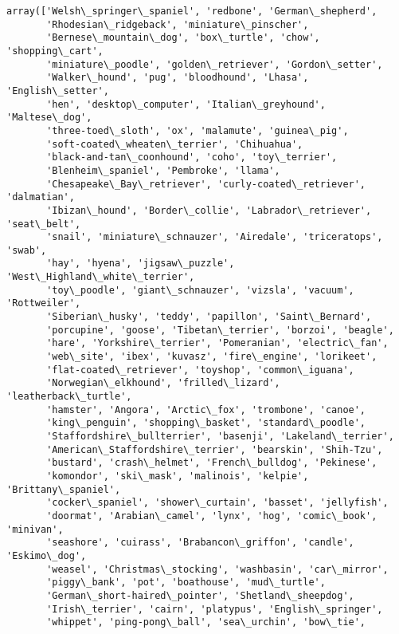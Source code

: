 \documentclass[11pt]{article}
\makeatletter
\newcommand{\boxspacing}{\kern\kvtcb@left@rule\kern\kvtcb@boxsep}
\newcommand{\prompt}[4]{
        {\ttfamily\llap{{\color{#2}[#3]:\hspace{3pt}#4}}\vspace{-\baselineskip}}
    }
\makeatother
\begin{document}
            \begin{tcolorbox}[breakable, size=fbox, boxrule=.5pt, pad at break*=1mm, opacityfill=0]
\prompt{Out}{outcolor}{25}{\boxspacing}
\begin{Verbatim}[commandchars=\\\{\}]
array(['Welsh\_springer\_spaniel', 'redbone', 'German\_shepherd',
       'Rhodesian\_ridgeback', 'miniature\_pinscher',
       'Bernese\_mountain\_dog', 'box\_turtle', 'chow', 'shopping\_cart',
       'miniature\_poodle', 'golden\_retriever', 'Gordon\_setter',
       'Walker\_hound', 'pug', 'bloodhound', 'Lhasa', 'English\_setter',
       'hen', 'desktop\_computer', 'Italian\_greyhound', 'Maltese\_dog',
       'three-toed\_sloth', 'ox', 'malamute', 'guinea\_pig',
       'soft-coated\_wheaten\_terrier', 'Chihuahua',
       'black-and-tan\_coonhound', 'coho', 'toy\_terrier',
       'Blenheim\_spaniel', 'Pembroke', 'llama',
       'Chesapeake\_Bay\_retriever', 'curly-coated\_retriever', 'dalmatian',
       'Ibizan\_hound', 'Border\_collie', 'Labrador\_retriever', 'seat\_belt',
       'snail', 'miniature\_schnauzer', 'Airedale', 'triceratops', 'swab',
       'hay', 'hyena', 'jigsaw\_puzzle', 'West\_Highland\_white\_terrier',
       'toy\_poodle', 'giant\_schnauzer', 'vizsla', 'vacuum', 'Rottweiler',
       'Siberian\_husky', 'teddy', 'papillon', 'Saint\_Bernard',
       'porcupine', 'goose', 'Tibetan\_terrier', 'borzoi', 'beagle',
       'hare', 'Yorkshire\_terrier', 'Pomeranian', 'electric\_fan',
       'web\_site', 'ibex', 'kuvasz', 'fire\_engine', 'lorikeet',
       'flat-coated\_retriever', 'toyshop', 'common\_iguana',
       'Norwegian\_elkhound', 'frilled\_lizard', 'leatherback\_turtle',
       'hamster', 'Angora', 'Arctic\_fox', 'trombone', 'canoe',
       'king\_penguin', 'shopping\_basket', 'standard\_poodle',
       'Staffordshire\_bullterrier', 'basenji', 'Lakeland\_terrier',
       'American\_Staffordshire\_terrier', 'bearskin', 'Shih-Tzu',
       'bustard', 'crash\_helmet', 'French\_bulldog', 'Pekinese',
       'komondor', 'ski\_mask', 'malinois', 'kelpie', 'Brittany\_spaniel',
       'cocker\_spaniel', 'shower\_curtain', 'basset', 'jellyfish',
       'doormat', 'Arabian\_camel', 'lynx', 'hog', 'comic\_book', 'minivan',
       'seashore', 'cuirass', 'Brabancon\_griffon', 'candle', 'Eskimo\_dog',
       'weasel', 'Christmas\_stocking', 'washbasin', 'car\_mirror',
       'piggy\_bank', 'pot', 'boathouse', 'mud\_turtle',
       'German\_short-haired\_pointer', 'Shetland\_sheepdog',
       'Irish\_terrier', 'cairn', 'platypus', 'English\_springer',
       'whippet', 'ping-pong\_ball', 'sea\_urchin', 'bow\_tie',

\end{Verbatim}
\end{tcolorbox}
\end{document}
